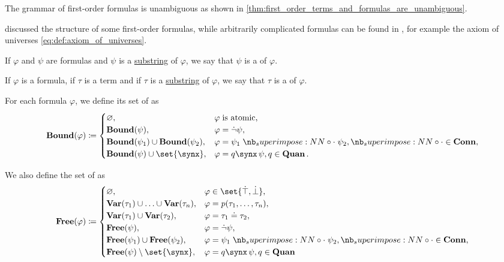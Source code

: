 \begin{definition}
\begin{thmenum}
    The grammar of first-order formulas is unambiguous as shown in \cref{thm:first_order_terms_and_formulas_are_unambiguous}.

     discussed the structure of some first-order formulas, while arbitrarily complicated formulas can be found in , for example the axiom of universes \eqref{eq:def:axiom_of_universes}.

     If \( \varphi \) and \( \psi \) are formulas and \( \psi \) is a \hyperref[def:formal_language/substring]{substring} of \( \varphi \), we say that \( \psi \) is a  of \( \varphi \).

     If \( \varphi \) is a formula, if \( \tau \) is a term and if \( \tau \) is a \hyperref[def:formal_language/substring]{substring} of \( \varphi \), we say that \( \tau \) is a  of \( \varphi \).

     For each formula \( \varphi \), we define its set of  as
    \begin{equation*}
      \op*{Bound}(\varphi) \coloneqq \begin{cases}
        \varnothing,                                        &\varphi \T{is atomic,} \\
        \op*{Bound}(\psi),                               &\varphi = \synneg \psi, \\
        \op*{Bound}(\psi_1) \cup \op*{Bound}(\psi_2), &\varphi = \psi_1 \syncirc \psi_2, {\syncirc} \in \op*{Conn}, \\
        \op*{Bound}(\psi) \cup \set{ \synx },              &\varphi = \quantifier{q}{\synx} \psi, q \in \op*{Quan}.
      \end{cases}
    \end{equation*}

     We also define the set of  as
    \begin{equation*}
      \op*{Free}(\varphi) \coloneqq \begin{cases}
        \varnothing,                                                &\varphi \in \set{ \syntop, \synbot }, \\
        \op*{Var}(\tau_1) \cup \ldots \cup \op*{Var}(\tau_n), &\varphi = p(\tau_1, \ldots, \tau_n), \\
        \op*{Var}(\tau_1) \cup \op*{Var}(\tau_2),             &\varphi = \tau_1 \syneq \tau_2, \\
        \op*{Free}(\psi),                                        &\varphi = \synneg \psi, \\
        \op*{Free}(\psi_1) \cup \op*{Free}(\psi_2),           &\varphi = \psi_1 \syncirc \psi_2, {\syncirc} \in \op*{Conn}, \\
        \op*{Free}(\psi) \setminus \set{ \synx },                  &\varphi = \quantifier{q}{\synx} \psi, q \in \op*{Quan}
      \end{cases}
    \end{equation*}


\end{thmenum}
\end{definition}
